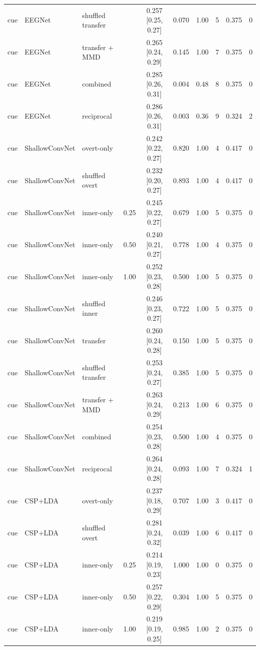\begin{longtable}{llllcccccc}
cue & EEGNet & shuffled transfer &  & 0.257 [0.25, 0.27] & 0.070 & 1.00 & 5 & 0.375 & 0 \\
cue & EEGNet & transfer + MMD &  & 0.265 [0.24, 0.29] & 0.145 & 1.00 & 7 & 0.375 & 0 \\
cue & EEGNet & combined &  & 0.285 [0.26, 0.31] & 0.004 & 0.48 & 8 & 0.375 & 0 \\
cue & EEGNet & reciprocal &  & 0.286 [0.26, 0.31] & 0.003 & 0.36 & 9 & 0.324 & 2 \\
cue & ShallowConvNet & overt-only &  & 0.242 [0.22, 0.27] & 0.820 & 1.00 & 4 & 0.417 & 0 \\
cue & ShallowConvNet & shuffled overt &  & 0.232 [0.20, 0.27] & 0.893 & 1.00 & 4 & 0.417 & 0 \\
cue & ShallowConvNet & inner-only & 0.25 & 0.245 [0.22, 0.27] & 0.679 & 1.00 & 5 & 0.375 & 0 \\
cue & ShallowConvNet & inner-only & 0.50 & 0.240 [0.21, 0.27] & 0.778 & 1.00 & 4 & 0.375 & 0 \\
cue & ShallowConvNet & inner-only & 1.00 & 0.252 [0.23, 0.28] & 0.500 & 1.00 & 5 & 0.375 & 0 \\
cue & ShallowConvNet & shuffled inner &  & 0.246 [0.23, 0.27] & 0.722 & 1.00 & 5 & 0.375 & 0 \\
cue & ShallowConvNet & transfer &  & 0.260 [0.24, 0.28] & 0.150 & 1.00 & 5 & 0.375 & 0 \\
cue & ShallowConvNet & shuffled transfer &  & 0.253 [0.24, 0.27] & 0.385 & 1.00 & 5 & 0.375 & 0 \\
cue & ShallowConvNet & transfer + MMD &  & 0.263 [0.24, 0.29] & 0.213 & 1.00 & 6 & 0.375 & 0 \\
cue & ShallowConvNet & combined &  & 0.254 [0.23, 0.28] & 0.500 & 1.00 & 4 & 0.375 & 0 \\
cue & ShallowConvNet & reciprocal &  & 0.264 [0.24, 0.28] & 0.093 & 1.00 & 7 & 0.324 & 1 \\
cue & CSP+LDA & overt-only &  & 0.237 [0.18, 0.29] & 0.707 & 1.00 & 3 & 0.417 & 0 \\
cue & CSP+LDA & shuffled overt &  & 0.281 [0.24, 0.32] & 0.039 & 1.00 & 6 & 0.417 & 0 \\
cue & CSP+LDA & inner-only & 0.25 & 0.214 [0.19, 0.23] & 1.000 & 1.00 & 0 & 0.375 & 0 \\
cue & CSP+LDA & inner-only & 0.50 & 0.257 [0.22, 0.29] & 0.304 & 1.00 & 5 & 0.375 & 0 \\
cue & CSP+LDA & inner-only & 1.00 & 0.219 [0.19, 0.25] & 0.985 & 1.00 & 2 & 0.375 & 0 \\

\end{longtable}
